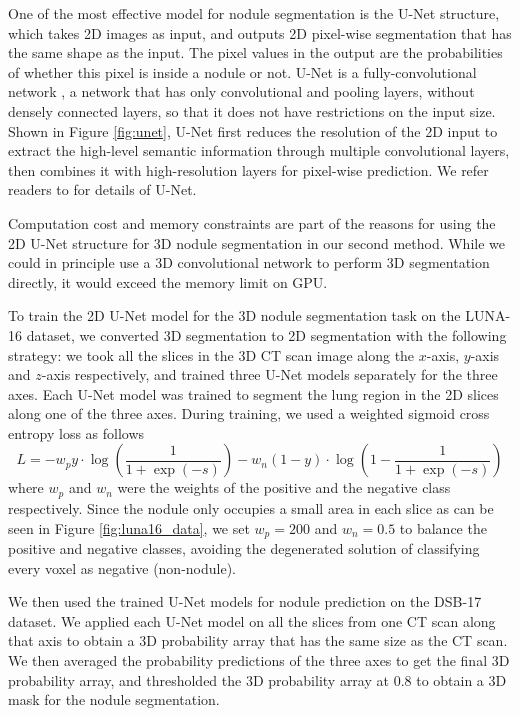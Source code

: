 \documentclass{article}
\begin{document}
One of the most effective model for nodule segmentation is the U-Net \cite{ronneberger2015u} structure, which takes 2D images as input, and outputs 2D pixel-wise segmentation that has the same shape as the input. The pixel values in the output are the probabilities of whether this pixel is inside a nodule or not. U-Net is a fully-convolutional network \cite{long2015fully}, a network that has only convolutional and pooling layers, without densely connected layers, so that it does not have restrictions on the input size. Shown in Figure \ref{fig:unet}, U-Net first reduces the resolution of the 2D input to extract the high-level semantic information through multiple convolutional layers, then combines it with high-resolution layers for pixel-wise prediction. We refer readers to \cite{ronneberger2015u} for details of U-Net.

Computation cost and memory constraints are part of the reasons for using the 2D U-Net structure for 3D nodule segmentation in our second method. While we could in principle use a 3D convolutional network to perform 3D segmentation directly, it would exceed the memory limit on GPU.

To train the 2D U-Net model for the 3D nodule segmentation task on the LUNA-16 dataset, we converted 3D segmentation to 2D segmentation with the following strategy: we took all the slices in the 3D CT scan image along the $x$-axis, $y$-axis and $z$-axis respectively, and trained three U-Net models separately for the three axes. Each U-Net model was trained to segment the lung region in the 2D slices along one of the three axes. During training, we used a weighted sigmoid cross entropy loss as follows
\begin{equation}
L = - w_p y \cdot \log \left( \frac{1}{1 + \exp(-s)} \right) - w_n (1 - y) \cdot \log \left(1 - \frac{1}{1 + \exp(-s)}\right)
\end{equation}
where $w_p$ and $w_n$ were the weights of the positive and the negative class respectively. Since the nodule only occupies a small area in each slice as can be seen in Figure \ref{fig:luna16_data}, we set $w_p = 200$ and $w_n = 0.5$ to  balance the positive and negative classes, avoiding the degenerated solution of classifying every voxel as negative (non-nodule).

We then used the trained U-Net models for nodule prediction on the DSB-17 dataset. We applied each U-Net model on all the slices from one CT scan along that axis to obtain a 3D probability array that has the same size as the CT scan. We then averaged the probability predictions of the three axes to get the final 3D probability array, and thresholded the 3D probability array at 0.8 to obtain a 3D mask for the nodule segmentation.
\end{document}
